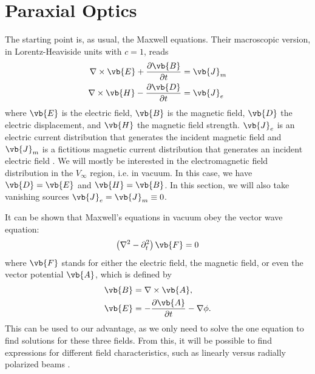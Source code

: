 \documentclass[11pt,SymmetricalJury]{inrsthesis/inrsthesis}
\begin{document}
\section{Paraxial Optics}

The starting point is, as usual, the Maxwell equations. Their macroscopic version,
in Lorentz-Heaviside units with $c=1$, reads
  \begin{subequations}
  \begin{align}
    \nabla\times\vb{E} + \frac{\partial\vb{B}}{\partial t}  &= \vb{J}_m \\
    \nabla\times\vb{H} - \frac{\partial\vb{D}}{\partial t}  &= \vb{J}_e
  \end{align}
  \end{subequations}
where $\vb{E}$ is the electric field, $\vb{B}$ is the magnetic field, $\vb{D}$
the electric displacement, and $\vb{H}$ the magnetic field strength. $\vb{J}_e$
is an electric current distribution that generates the incident magnetic field
and $\vb{J}_m$ is a fictitious magnetic current distribution that generates an
incident electric field \cite{Schelkunoff1936,Elliott2003}. We will mostly be
interested in the electromagnetic field distribution in the $V_\infty$ region,
i.e. in vacuum. In this case, we have $\vb{D}=\vb{E}$ and $\vb{H}=\vb{B}$. In
this section, we will also take vanishing sources $\vb{J}_e=\vb{J}_m\equiv0$.

It can be shown that Maxwell's equations in vacuum obey the vector wave equation:
  \begin{equation}
     \left(\nabla^2-\partial_t^2\right)\vb{F}=0
  \end{equation}
where $\vb{F}$ stands for either the electric field, the magnetic field, or even
the vector potential $\vb{A}$, which is defined by
  \begin{subequations}
  \begin{align}
    \vb{B} &=\nabla\times\vb{A}, \\
    \vb{E} &= -\frac{\partial\vb{A}}{\partial t} - \nabla\phi.
  \end{align}
  \end{subequations}
This can be used to our advantage, as we only need to solve the one equation
to find solutions for these three fields. From this, it will be possible to
find expressions for different field characteristics, such as linearly versus
radially polarized beams \cite{Salamin}.
\end{document}
